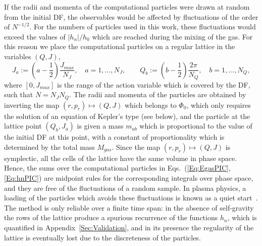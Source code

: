 If the radii and momenta of the computational particles were drawn at random from the initial DF, the observables would be affected by fluctuations of the order of $N^{-1/2}$. For the numbers of particles used in this work, these fluctuations would exceed the values of $|h_n|/h_0$ which are reached during the mixing of the gas. For this reason we place the computational particles on a regular lattice in the variables $(Q,J)$,
\begin{equation}
J_a := \left( a - \frac{1}{2} \right)\frac{J_{max}}{N_J},\quad a = 1,\ldots,N_J,\qquad
Q_b := \left( b - \frac{1}{2} \right)\frac{2\pi}{N_Q},\quad b = 1,\ldots,N_Q,
\label{Eq:Lattice}
\end{equation}
where $[0,J_{max}]$ is the range of the action variable which is covered by the DF, such that $N = N_J N_Q$. The radii and momenta of the particles are obtained by inverting the map $(r,p_r)\mapsto (Q,J)$ which belongs to $\Phi_0$, which only requires the solution of an equation of Kepler's type (see below), and the particle at the lattice point $(Q_b,J_a)$ is given a mass $m_{ab}$ which is proportional to the value of the initial DF at this point, with a constant of proportionality which is determined by the total mass $M_{gas}$. Since the map $(r,p_r)\mapsto (Q,J)$ is symplectic, all the cells of the lattice have the same volume in phase space. Hence, the sums over the computational particles in Eqs.~(\ref{Eq:EgasPIC},\ref{Eq:hnPIC}) are midpoint rules for the corresponding integrals over phase space, and they are free of the fluctuations of a random sample. In plasma physics, a loading of the particles which avoids these fluctuations is known as a quiet start~\cite{BirdsallLangdon-Book}. The method is only reliable over a finite time span: in the absence of self-gravity the rows of the lattice produce a spurious recurrence of the functions $h_n$, which is quantified in Appendix~\ref{Sec:Validation}, and in its presence the regularity of the lattice is eventually lost due to the discreteness of the particles.

